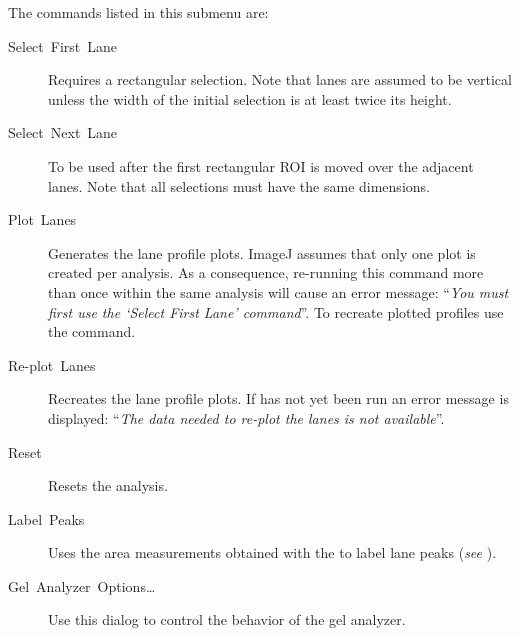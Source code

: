 The commands listed in this submenu are:
\begin{description}
\item [{Select\ First\ Lane\ \textmd{}}] Requires
a rectangular selection. Note that lanes are assumed to be vertical
unless the width of the initial selection is at least twice its height.
\item [{Select\ Next\ Lane\ \textmd{}}] To be used
after the first rectangular ROI is moved over the adjacent lanes.
Note that all selections must have the same dimensions.
\item [{Plot\ Lanes\ \ \textmd{}}] Generates the lane
profile plots. ImageJ assumes that only one plot is created per analysis.
As a consequence, re-running this command more than once within the
same analysis will cause an error message: ``\emph{You must first
use the `Select First Lane' command}''. To recreate plotted profiles
use the  command.
\item [{Re-plot\ Lanes}] Recreates the lane profile plots. If 
has not yet been run an error message is displayed: ``\emph{The data
needed to re-plot the lanes is not available}''.
\item [{Reset}] Resets the analysis.
\item [{Label\ Peaks}] Uses the area measurements obtained with the 
to label lane peaks (\emph{see} ).
\item [{\label{misc:GelAnalyzerOptions}Gel\ Analyzer\ Options\ldots{}}] Use
this dialog to control the behavior of the gel analyzer.


\end{description}
